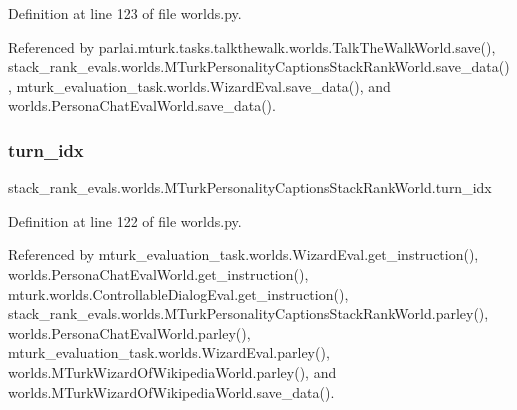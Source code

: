 Definition at line 123 of file worlds.\+py.



Referenced by parlai.\+mturk.\+tasks.\+talkthewalk.\+worlds.\+Talk\+The\+Walk\+World.\+save(), stack\+\_\+rank\+\_\+evals.\+worlds.\+M\+Turk\+Personality\+Captions\+Stack\+Rank\+World.\+save\+\_\+data(), mturk\+\_\+evaluation\+\_\+task.\+worlds.\+Wizard\+Eval.\+save\+\_\+data(), and worlds.\+Persona\+Chat\+Eval\+World.\+save\+\_\+data().

\mbox{\label{classstack__rank__evals_1_1worlds_1_1MTurkPersonalityCaptionsStackRankWorld_a18989404966ba686a9b698e4d7d5fe39}} 
\subsubsection{\texorpdfstring{turn\+\_\+idx}{turn\_idx}}
{\footnotesize\ttfamily stack\+\_\+rank\+\_\+evals.\+worlds.\+M\+Turk\+Personality\+Captions\+Stack\+Rank\+World.\+turn\+\_\+idx}



Definition at line 122 of file worlds.\+py.



Referenced by mturk\+\_\+evaluation\+\_\+task.\+worlds.\+Wizard\+Eval.\+get\+\_\+instruction(), worlds.\+Persona\+Chat\+Eval\+World.\+get\+\_\+instruction(), mturk.\+worlds.\+Controllable\+Dialog\+Eval.\+get\+\_\+instruction(), stack\+\_\+rank\+\_\+evals.\+worlds.\+M\+Turk\+Personality\+Captions\+Stack\+Rank\+World.\+parley(), worlds.\+Persona\+Chat\+Eval\+World.\+parley(), mturk\+\_\+evaluation\+\_\+task.\+worlds.\+Wizard\+Eval.\+parley(), worlds.\+M\+Turk\+Wizard\+Of\+Wikipedia\+World.\+parley(), and worlds.\+M\+Turk\+Wizard\+Of\+Wikipedia\+World.\+save\+\_\+data().

\mbox{\label{classstack__rank__evals_1_1worlds_1_1MTurkPersonalityCaptionsStackRankWorld_a4e5521465cddfe352b897ca6b7d36ae5}} 
